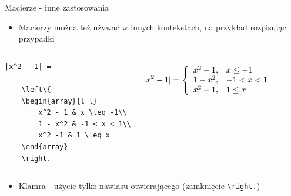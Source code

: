\documentclass{beamer}
\theoremstyle{newblock}
\begin{document}
\begin{frame}[fragile]{Macierze - inne zastosowania}
    \begin{itemize}
        \item Macierzy można też używać w innych kontekstach, na przykład rozpisując przypadki
    \end{itemize}
    \begin{columns}

\begin{verbatim}
|x^2 - 1| = 
    
    \left\{
    \begin{array}{l l}
        x^2 - 1 & x \leq -1\\
        1 - x^2 & -1 < x < 1\\
        x^2 -1 & 1 \leq x
    \end{array}
    \right.
\end{verbatim}
            \begin{equation*}
                |x^2 - 1| = 
                \left\{
                \begin{array}{l l}
                    x^2 - 1, & x \leq -1\\
                    1 - x^2, & -1 < x < 1\\
                    x^2 - 1, & 1 \leq x
                \end{array}
                \right.
            \end{equation*}
    \end{columns}

    \begin{itemize}
        \item Klamra - użycie tylko nawiasu otwierającego (zamknięcie \verb|\right.|)
    \end{itemize}

    

\end{frame}
\end{document}

